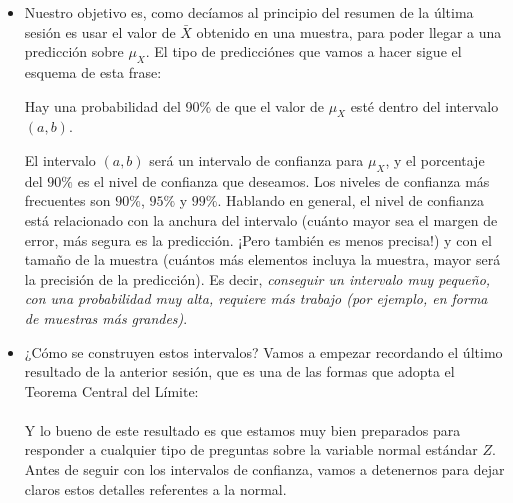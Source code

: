 \begin{itemize}
    \item  Nuestro objetivo es, como decíamos al principio del resumen de la última sesión es usar el valor de $\bar X$ obtenido en una muestra, para  poder llegar a una predicción sobre $\mu_X$. El tipo de predicciónes que vamos a hacer sigue el esquema de esta frase:
       \begin{center}
       {\sf Hay una probabilidad del 90\% de que el valor de $\mu_X$ esté dentro del intervalo $(a,b)$.}
       \end{center}
       El intervalo $(a,b)$ será un {\sf intervalo de confianza} para $\mu_X$, y el porcentaje del $90\%$ es el {\sf nivel de confianza} que deseamos. Los niveles de confianza más frecuentes son $90\%$, $95\%$ y $99\%$. Hablando en general, el nivel de confianza está relacionado con la anchura del intervalo (cuánto mayor sea el margen de error, más segura es la predicción. ¡Pero también es menos precisa!) y con el tamaño de la muestra (cuántos más elementos incluya la muestra, mayor será la precisión de la predicción). Es decir, {\em conseguir un intervalo muy pequeño, con una probabilidad muy alta, requiere más trabajo (por ejemplo, en forma de muestras más grandes)}.

    \item ¿Cómo se construyen estos intervalos? Vamos a empezar recordando el último resultado de la anterior sesión, que es una de las formas que adopta el Teorema Central del Límite:\\[3mm]
       \\[3mm]
       Y lo bueno de este resultado es que estamos muy bien preparados para responder a cualquier tipo de preguntas sobre la variable normal estándar $Z$. Antes de seguir con los intervalos de confianza, vamos a
       detenernos para dejar claros estos detalles referentes a la normal.

       \end{itemize}

